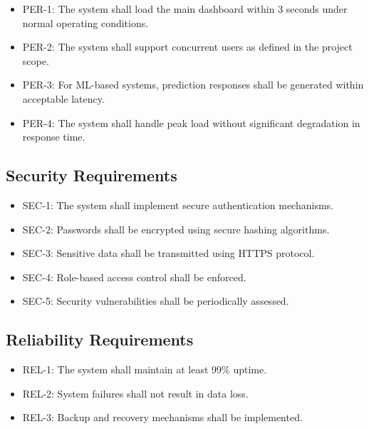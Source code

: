 \begin{itemize}
\item PER-1: The system shall load the main dashboard within 3 seconds under normal operating conditions.
\item PER-2: The system shall support concurrent users as defined in the project scope.
\item PER-3: For ML-based systems, prediction responses shall be generated within acceptable latency.
\item PER-4: The system shall handle peak load without significant degradation in response time.
\end{itemize}


\subsection{Security Requirements}

\begin{itemize}
\item SEC-1: The system shall implement secure authentication mechanisms.
\item SEC-2: Passwords shall be encrypted using secure hashing algorithms.
\item SEC-3: Sensitive data shall be transmitted using HTTPS protocol.
\item SEC-4: Role-based access control shall be enforced.
\item SEC-5: Security vulnerabilities shall be periodically assessed.
\end{itemize}


\subsection{Reliability Requirements}

\begin{itemize}
\item REL-1: The system shall maintain at least 99\% uptime.
\item REL-2: System failures shall not result in data loss.
\item REL-3: Backup and recovery mechanisms shall be implemented.
\end{itemize}


